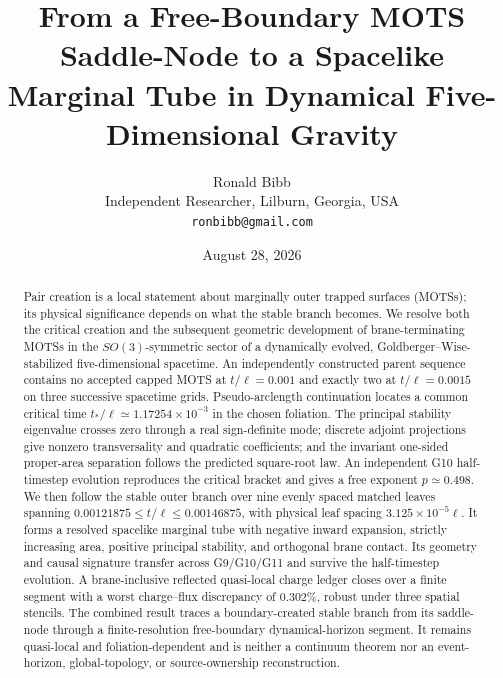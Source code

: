 \documentclass[11pt]{article}
\begin{document}
\title{From a Free-Boundary MOTS Saddle-Node to a Spacelike Marginal Tube
in Dynamical Five-Dimensional Gravity}
\author{Ronald Bibb\\
\small Independent Researcher, Lilburn, Georgia, USA\\
\small \texttt{ronbibb@gmail.com}}
\date{August 28, 2026}

\maketitle

\begin{abstract}
Pair creation is a local statement about marginally outer trapped surfaces
(MOTSs); its physical significance depends on what the stable branch becomes.
We resolve both the critical creation and the subsequent geometric development
of brane-terminating MOTSs in the $SO(3)$-symmetric sector of a dynamically
evolved, Goldberger--Wise-stabilized five-dimensional spacetime.  An
independently constructed parent sequence contains no accepted capped MOTS at
$t/\ell=0.001$ and exactly two at $t/\ell=0.0015$ on three successive
spacetime grids.  Pseudo-arclength continuation locates a common critical time
$t_*/\ell\simeq1.17254\times10^{-3}$ in the chosen foliation.  The principal
stability eigenvalue crosses zero through a real sign-definite mode; discrete
adjoint projections give nonzero transversality and quadratic coefficients;
and the invariant one-sided proper-area separation follows the predicted
square-root law.  An independent G10 half-timestep evolution reproduces the
critical bracket and gives a free exponent $p\simeq0.498$.  We then follow the
stable outer branch over nine evenly spaced matched leaves spanning
$0.00121875\leq t/\ell\leq0.00146875$, with physical leaf spacing
$3.125\times10^{-5}\ell$.  It forms a resolved spacelike
marginal tube with negative inward expansion, strictly increasing area,
positive principal stability, and orthogonal brane contact.  Its geometry and
causal signature transfer across G9/G10/G11 and survive the half-timestep
evolution.  A brane-inclusive reflected quasi-local charge ledger closes over
a finite segment with a worst charge--flux discrepancy of $0.302\%$, robust
under three spatial stencils.  The combined result traces a boundary-created
stable branch from its saddle-node through a finite-resolution
free-boundary dynamical-horizon segment.  It remains quasi-local and
foliation-dependent and is neither a continuum theorem nor an event-horizon,
global-topology, or source-ownership reconstruction.
\end{abstract}
\end{document}
